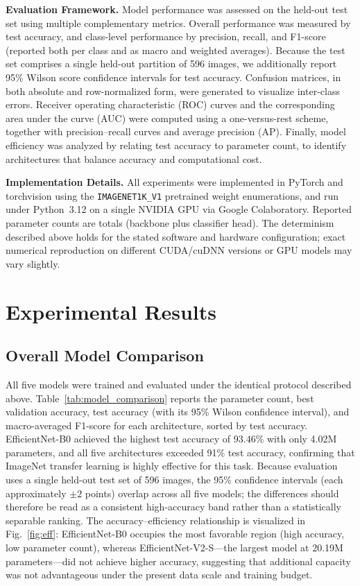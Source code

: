 \documentclass[conference]{IEEEtran}
\begin{document}
\textbf{Evaluation Framework.}
Model performance was assessed on the held-out test set using multiple complementary metrics. Overall performance was measured by test accuracy, and class-level performance by precision, recall, and F1-score (reported both per class and as macro and weighted averages). Because the test set comprises a single held-out partition of 596 images, we additionally report 95\% Wilson score confidence intervals for test accuracy. Confusion matrices, in both absolute and row-normalized form, were generated to visualize inter-class errors. Receiver operating characteristic (ROC) curves and the corresponding area under the curve (AUC) were computed using a one-versus-rest scheme, together with precision--recall curves and average precision (AP). Finally, model efficiency was analyzed by relating test accuracy to parameter count, to identify architectures that balance accuracy and computational cost.

\textbf{Implementation Details.}
All experiments were implemented in PyTorch and torchvision using the \texttt{IMAGENET1K\_V1} pretrained weight enumerations, and run under Python~3.12 on a single NVIDIA GPU via Google Colaboratory. Reported parameter counts are totals (backbone plus classifier head). The determinism described above holds for the stated software and hardware configuration; exact numerical reproduction on different CUDA/cuDNN versions or GPU models may vary slightly.

\section{Experimental Results}

\subsection{Overall Model Comparison}
All five models were trained and evaluated under the identical protocol described above. Table~\ref{tab:model_comparison} reports the parameter count, best validation accuracy, test accuracy (with its 95\% Wilson confidence interval), and macro-averaged F1-score for each architecture, sorted by test accuracy. EfficientNet-B0 achieved the highest test accuracy of 93.46\% with only 4.02M parameters, and all five architectures exceeded 91\% test accuracy, confirming that ImageNet transfer learning is highly effective for this task. Because evaluation uses a single held-out test set of 596 images, the 95\% confidence intervals (each approximately $\pm2$ points) overlap across all five models; the differences should therefore be read as a consistent high-accuracy band rather than a statistically separable ranking. The accuracy--efficiency relationship is visualized in Fig.~\ref{fig:eff}: EfficientNet-B0 occupies the most favorable region (high accuracy, low parameter count), whereas EfficientNet-V2-S---the largest model at 20.19M parameters---did not achieve higher accuracy, suggesting that additional capacity was not advantageous under the present data scale and training budget.
\end{document}
